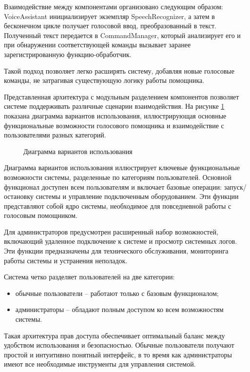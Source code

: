 Взаимодействие между компонентами организовано следующим образом: VoiceAssistant инициализирует экземпляр SpeechRecognizer, а затем в бесконечном цикле получает голосовой ввод, преобразованный в текст. Полученный текст передается в CommandManager, который анализирует его и при обнаружении соответствующей команды вызывает заранее зарегистрированную функцию-обработчик.

Такой подход позволяет легко расширять систему, добавляя новые голосовые команды, не затрагивая существующую логику работы помощника.

Представленная архитектура с модульным разделением компонентов позволяет системе поддерживать различные сценарии взаимодействия. На рисунке \ref{fig:use_case_diagram} показана диаграмма вариантов использования, иллюстрирующая основные функциональные возможности голосового помощника и взаимодействие с пользователями разных категорий.

\begin{figure}[H]
	\centering
	\caption{Диаграмма вариантов использования}
	\label{fig:use_case_diagram}
\end{figure}

Диаграмма вариантов использования иллюстрирует ключевые функциональные возможности системы, разделенные по категориям пользователей. Основной функционал доступен всем пользователям и включает базовые операции: запуск/остановку системы и управление подключенным оборудованием. Эти функции представляют собой ядро системы, необходимое для повседневной работы с голосовым помощником.

Для администраторов предусмотрен расширенный набор возможностей, включающий удаленное подключение к системе и просмотр системных логов. Эти функции предназначены для технического обслуживания, мониторинга работы системы и устранения неполадок.

Система четко разделяет пользователей на две категории:
\begin{itemize}
	\item обычные пользователи -- работают только с базовым функционалом;
	\item администраторы -- обладают полным доступом ко всем возможностям системы.
\end{itemize}

Такая архитектура прав доступа обеспечивает оптимальный баланс между удобством использования и безопасностью. Обычные пользователи получают простой и интуитивно понятный интерфейс, в то время как администраторы имеют все необходимые инструменты для управления системой.


